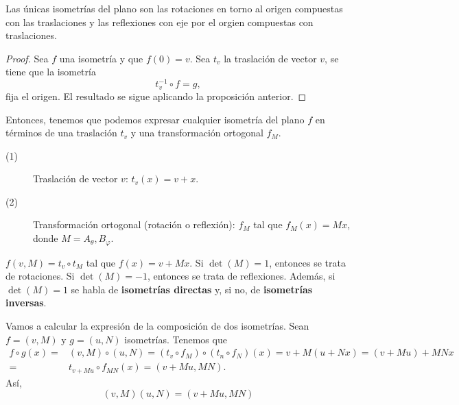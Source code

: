 \begin{fprop}[]
\normalfont Las únicas isometrías del plano son las rotaciones en torno al origen compuestas con las traslaciones y las reflexiones con eje por el orgien compuestas con traslaciones.
\end{fprop}

\begin{proof}
Sea $\displaystyle f $ una isometría y que $\displaystyle f\left(0\right) = v $. Sea $\displaystyle t_{v} $ la traslación de vector $\displaystyle v $, se tiene que la isometría
\[t ^{-1}_{v}\circ f = g ,\]
fija el origen. El resultado se sigue aplicando la proposición anterior.
\end{proof}
Entonces, tenemos que podemos expresar cualquier isometría del plano $\displaystyle f $ en términos de una traslación $\displaystyle t_{v} $ y una transformación ortogonal $\displaystyle f_{M} $.
\begin{description}
\item[(1)] Traslación de vector $\displaystyle v $: $\displaystyle t_{v}\left(x\right) = v + x $.
\item[(2)] Transformación ortogonal (rotación o reflexión): $\displaystyle f_{M} $ tal que $\displaystyle f_{M}\left(x\right)= Mx $, donde $\displaystyle M = A_{\theta}, B_{\varphi} $.
\end{description}
\begin{notation}
\normalfont $\displaystyle f\left(v,M\right) = t_{v} \circ t_{M} $ tal que $\displaystyle f\left(x\right) = v + Mx $. Si $\displaystyle \det\left(M\right) = 1 $, entonces se trata de rotaciones. Si $\displaystyle \det\left(M\right) = -1 $, entonces se trata de reflexiones. Además, si $\displaystyle \det\left(M\right) = 1 $ se habla de \textbf{isometrías directas} y, si no, de \textbf{isometrías inversas}.
\end{notation}
 Vamos a calcular la expresión de la composición de dos isometrías. Sean $\displaystyle f=\left(v,M\right) $ y $\displaystyle g=\left(u,N\right) $ isometrías. Tenemos que
\[
\begin{split}
	f\circ g\left(x\right) = & \left(v, M\right)\circ\left(u,N\right) = \left(t_{v}\circ f_{M}\right)\circ\left(t_{n}\circ f_{N}\right)\left(x\right) = v + M\left(u + Nx\right)= \left(v + Mu\right) + MNx \\
	= & t_{v+Mu} \circ f_{MN}\left(x\right)=\left(v + Mu, MN\right).
\end{split}
\]
Así,
\[
\boxed{\left(v,M\right)\left(u,N\right) = \left(v + Mu, MN\right)}
\]


